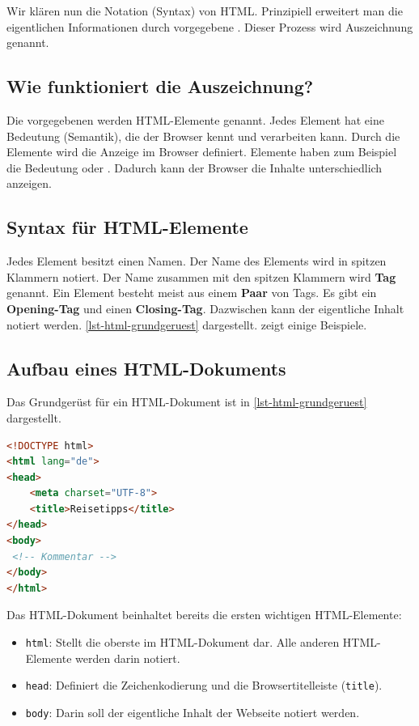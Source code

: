 Wir klären nun die Notation (Syntax) von \ac{HTML}. Prinzipiell erweitert man die eigentlichen Informationen durch vorgegebene . Dieser Prozess wird Auszeichnung genannt.

\subsection{Wie funktioniert die Auszeichnung?}

Die vorgegebenen  werden \ac{HTML}-Elemente genannt. Jedes Element hat eine Bedeutung (Semantik), die der Browser kennt und verarbeiten kann. Durch die Elemente wird die Anzeige im Browser definiert. Elemente haben zum Beispiel die Bedeutung  oder . Dadurch kann der Browser die Inhalte unterschiedlich anzeigen.

\subsection{Syntax für \ac{HTML}-Elemente}

Jedes Element besitzt einen Namen. Der Name des Elements wird in spitzen Klammern notiert. Der Name zusammen mit den spitzen Klammern wird \textbf{Tag} genannt. Ein Element besteht meist aus einem \textbf{Paar} von Tags. Es gibt ein \textbf{Opening-Tag} und einen \textbf{Closing-Tag}. Dazwischen kann der eigentliche Inhalt notiert werden. \autoref{lst-html-grundgeruest} dargestellt. zeigt einige Beispiele.

\subsection{Aufbau eines \ac{HTML}-Dokuments}

Das Grundgerüst für ein \ac{HTML}-Dokument ist in \autoref{lst-html-grundgeruest} dargestellt.

\begin{lstlisting}[language=HTML, showspaces=FALSE, caption={Grundgerüst}, label={lst-html-grundgeruest}]
<!DOCTYPE html>
<html lang="de">
<head>
    <meta charset="UTF-8">
    <title>Reisetipps</title>
</head>
<body>
 <!-- Kommentar -->
</body>
</html>
\end{lstlisting}

Das \ac{HTML}-Dokument beinhaltet bereits die ersten wichtigen \ac{HTML}-Elemente:

\begin{itemize}
\item \lstinline[language=html]{html}: Stellt die oberste  im \ac{HTML}-Dokument dar. Alle anderen HTML-Elemente werden darin notiert.
\item \lstinline[language=html]{head}: Definiert die Zeichenkodierung und die Browsertitelleiste (\lstinline[language=html]{title}).
\item \lstinline[language=html]{body}: Darin soll der eigentliche Inhalt der Webseite notiert werden.
\end{itemize}

